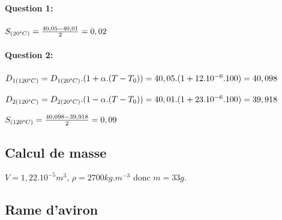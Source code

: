 \paragraph{Question 1:} $S_{(20\degree C)}=\frac{40,05-40,01}{2}=0,02$

\paragraph{Question 2:} $D_{1(120\degree C)}=D_{1(20\degree C)}.(1+\alpha.(T-T_0))=40,05.(1+12.10^{-6}.100)=40,098$

$D_{2(120\degree C)}=D_{2(20\degree C)}.(1-\alpha.(T-T_0))=40,01.(1+23.10^{-6}.100)=39,918$

$S_{(120\degree C)}=\frac{40,098-39,918}{2}=0,09$

\subsection{Calcul de masse}

$V=1,22.10^{-5}m^3$, $\rho=2700kg.m^{-3}$ donc $m=33g$.

\subsection{Rame d'aviron}

